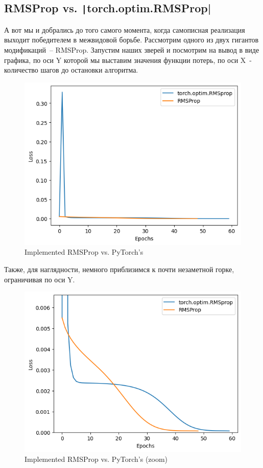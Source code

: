 \documentclass[12pt, a4paper, oneside, final]{article}
\begin{document}
	\subsection*{RMSProp vs. \texttt|torch.optim.RMSProp|}
	А вот мы и добрались до того самого момента, когда самописная реализация выходит победителем в межвидовой борьбе.
	Рассмотрим одного из двух гигантов модификаций~-- RMSProp.
	Запустим наших зверей и посмотрим на вывод в виде графика, по оси Y которой мы выставим значения функции потерь, по оси X~- количество шагов до остановки алгоритма.
	\begin{figure}[H]
		\centering
		\includegraphics[scale = 1]{Image/T1_RMSPROP_vs_torch_optim_RMSPROP.png}
		\caption*{Implemented RMSProp vs. PyTorch's}
	\end{figure}
	Также, для наглядности, немного приблизимся к почти незаметной горке, ограничивая по оси Y.
	\begin{figure}[H]
		\centering
		\includegraphics[scale = 1]{Image/T1_RMSPROP_vs_torch_optim_RMSPROP_ZOOM.png}
		\caption*{Implemented RMSProp vs. PyTorch's (zoom)}
	\end{figure}
\end{document}
